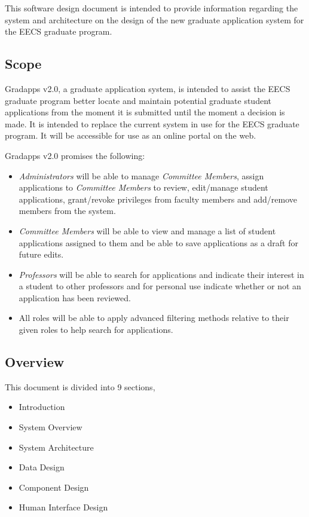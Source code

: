 \documentclass[fontsize=12pt,paper=letter,twoside]{scrartcl}
\begin{document}
This software design document is intended to provide information regarding the system and architecture on the design of the new graduate application system for the EECS graduate program.

\subsection{Scope}

Gradapps v2.0, a graduate application system, is intended to assist the EECS graduate program better locate and maintain potential graduate student applications from the moment it is submitted until the moment a decision is made. It is intended to replace the current system in use for the EECS graduate program. It will be accessible for use as an online portal on the web.

\smallskip
\noindent Gradapps v2.0 promises the following:
\begin{itemize}
\item \emph{Administrators} will be able to manage \emph{Committee Members}, assign applications to \emph{Committee Members} to review, edit/manage student applications, grant/revoke privileges from faculty members and add/remove members from the system.
\item \emph{Committee Members} will be able to view and manage a list of student applications assigned to them and be able to save applications as a draft for future edits.
\item \emph{Professors} will be able to search for applications and indicate their interest in a student to other professors and for personal use indicate whether or not an application has been reviewed.
\item All roles will be able to apply advanced filtering methods relative to their given roles to help search for applications.
\end{itemize}

\newpage
\subsection{Overview}

This document is divided into 9 sections,

\begin{itemize}
\item Introduction
\item System Overview
\item System Architecture
\item Data Design
\item Component Design
\item Human Interface Design
\end{itemize}
\end{document}
